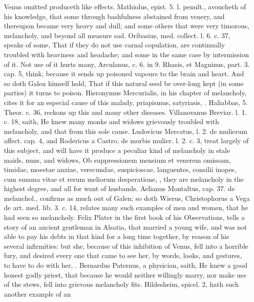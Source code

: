 {{Venus omitted produceth like effects. Mathiolus, epist. 5. l. penult.,
avoucheth of his knowledge, that some through bashfulness
abstained from venery, and thereupon became very heavy and dull; and
some others that were very timorous, melancholy, and beyond all measure
sad. Oribasius, med. collect. l. 6. c. 37, speaks of some, That
if they do not use carnal copulation, are continually troubled with
heaviness and headache; and some in the same case by intermission of
it. Not use of it hurts many, Arculanus, c. 6. in 9. Rhasis, et
Magninus, part. 3. cap. 5, think, because it sends up poisoned
vapours to the brain and heart. And so doth Galen himself hold, That if
this natural seed be over-long kept (in some parties) it turns to
poison. Hieronymus Mercurialis, in his chapter of melancholy, cites it
for an especial cause of this malady, priapismus, satyriasis, \etc{}.
Haliabbas, 5. Theor. c. 36, reckons up this and many other diseases.
Villanovanus Breviar. l. 1. c. 18, saith, He knew many monks and
widows grievously troubled with melancholy, and that from this sole
cause. Ludovicus Mercatus, l. 2. de mulierum affect. cap. 4, and
Rodericus a Castro, de morbis mulier. l. 2. c. 3, treat largely of this
subject, and will have it produce a peculiar kind of melancholy in
stale maids, nuns, and widows, Ob suppressionem mensium et venerem
omissam, timidae, moestae anxiae, verecundae, suspicioscae, languentes,
consilii inopes, cum summa vitae et rerum meliorum desperatione, \etc{},
they are melancholy in the highest degree, and all for want of
husbands. Aelianus Montaltus, cap. 37. de melanchol., confirms as much
out of Galen; so doth Wierus, Christophorus a Vega de art. med. lib. 3.
c. 14, relates many such examples of men and women, that he had seen so
melancholy. Felix Plater in the first book of his Observations,
tells a story of an ancient gentleman in Alsatia, that married a
young wife, and was not able to pay his debts in that kind for a long
time together, by reason of his several infirmities: but she, because
of this inhibition of Venus, fell into a horrible fury, and desired
every one that came to see her, by words, looks, and gestures, to have
to do with her, \etc{}. Bernardus Paternus, a physician, saith, He
knew a good honest godly priest, that because he would neither
willingly marry, nor make use of the stews, fell into grievous
melancholy fits. Hildesheim, spicel. 2, hath such another example of an
}}
